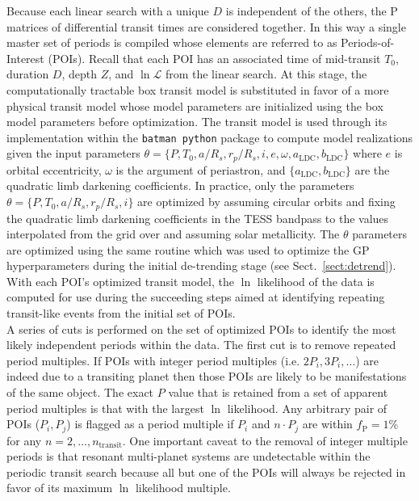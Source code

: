 Because each linear search with a unique $D$ is independent of the others, the P matrices of
differential transit times are considered together. In this way a single master set of periods
is compiled whose elements are referred to as Periods-of-Interest (POIs). Recall that each POI has
an associated time of mid-transit $T_0$, duration $D$, depth $Z$, and $\ln{\mathcal{L}}$
from the linear search. At this stage,
the computationally tractable box transit model is substituted in favor of a more
physical transit model whose model parameters are initialized using the box model parameters before
optimization. The \cite{mandel02} transit model is used through its implementation within the
\texttt{batman python} package \citep{kreidberg15} to
compute model realizations given the input parameters
$\theta=\{P, T_0,a/R_s, r_p/R_s,i,e,\omega,a_{\text{LDC}},b_{\text{LDC}}\}$ where $e$ is orbital eccentricity,
$\omega$ is the argument of periastron, and $\{a_{\text{LDC}},b_{\text{LDC}}\}$ are the quadratic limb
darkening coefficients. In practice, only
the parameters $\theta=\{P,T_0,a/R_s,r_p/R_s,i\}$ are optimized by assuming circular orbits and fixing
the quadratic limb darkening coefficients in the TESS bandpass to the values interpolated
from the \cite{claret17} grid over \teff{,} \logg{,} and assuming solar metallicity. The $\theta$
parameters are optimized using the same routine which was used to optimize the GP hyperparameters during
the initial de-trending stage (see Sect.~\ref{sect:detrend}). With each POI's optimized transit
model, the $\ln$ likelihood of the data is computed for use during the succeeding steps
aimed at identifying repeating transit-like events from the initial set of POIs. \\

A series of cuts is performed on the set of optimized POIs to identify the most likely independent
periods within the data. The first cut is to remove repeated period multiples.
If POIs with integer period multiples (i.e. $2P_i,3P_i,\dots$) are indeed due to a transiting planet
then those POIs are likely to be manifestations of the same object. The exact $P$ value that is retained
from a set of apparent period multiples is that
with the largest $\ln$ likelihood. Any arbitrary pair of POIs ($P_i,P_j$) is flagged
as a period multiple if $P_i$ and $n\cdot P_j$ are within $f_{\text{P}}=1$\% for any
$n=2,\dots,n_{\text{transit}}$. 
One important caveat to the removal of integer multiple periods is that resonant multi-planet systems
are undetectable within the periodic transit search because all but one of the POIs will always be
rejected in favor of its maximum $\ln$ likelihood multiple. \\

